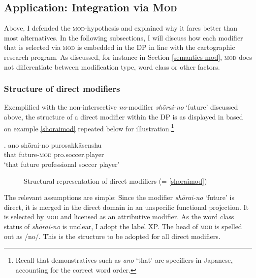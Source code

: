 \subsection{Application: Integration via \textsc{Mod}} \label{modintegration}
\largerpage[2]

Above, I defended the \textsc{mod}-hypothesis and explained why it fares better than most alternatives. In the following subsections, I will discuss how each modifier that is selected via \textsc{mod} is embedded in the DP in line with the cartographic research program. As discussed, for instance in Section \ref{semantics mod}, \textsc{mod} does not differentiate between modification type, word class or other factors.

\subsubsection{Structure of direct modifiers}

Exemplified with the non-intersective \textit{no}-modifier \textit{shōrai-no} `future’ discussed above, the structure of a direct modifier within the DP is as displayed in  based on example \ref{shoraimod} repeated below for illustration.\footnote{Recall that demonstratives such as \textit{ano} `that’ are specifiers in Japanese, accounting for the correct word order.}

\exg. ano shōrai-no purosakkāsenshu\\
that future-\textsc{mod} pro.soccer.player\\
`that future professional soccer player’ \label{shoraimod}

\begin{figure}
\centering
{}
\caption{Structural representation of direct modifiers (= \ref{shoraimod})}
\label{Tree ano shorai-no puro}
\end{figure}

The relevant assumptions are simple: Since the modifier \textit{shōrai-no} `future’ is direct, it is merged in the direct domain in an unspecific functional projection. It is selected by \textsc{mod} and licensed as an attributive modifier. As the word class status of \textit{shōrai-no} is unclear, I adopt the label XP. The head of \textsc{mod} is spelled out as /no/. This is the structure to be adopted for all direct modifiers.

